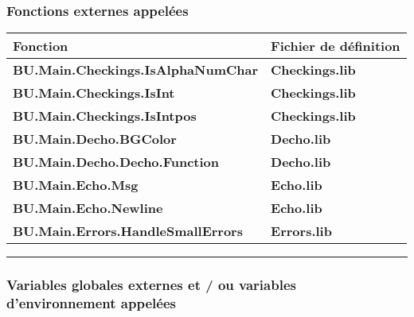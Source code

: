 \documentclass[a4paper,10pt]{article}
\begin{document}
    \subsubsection{Fonctions externes appelées}\color{text}

    \begin{justify}
        \begin{tabular}{|l|l|}
            \hline
            \textbf{Fonction} & \textbf{Fichier de définition}\\
            \hline
            \textbf{\color{func}BU.Main.Checkings.IsAlphaNumChar}    & \textbf{\color{path}Checkings.lib}\\
            \hline
            \textbf{\color{func}BU.Main.Checkings.IsInt}             & \textbf{\color{path}Checkings.lib}\\
            \hline
            \textbf{\color{func}BU.Main.Checkings.IsIntpos}          & \textbf{\color{path}Checkings.lib}\\
            \hline
            \textbf{\color{func}BU.Main.Decho.BGColor}              & \textbf{\color{path}Decho.lib}\\
            \hline
            \textbf{\color{func}BU.Main.Decho.Decho.Function}    & \textbf{\color{path}Decho.lib}\\
            \hline
            \textbf{\color{func}BU.Main.Echo.Msg}           & \textbf{\color{path}Echo.lib}\\
            \hline
            \textbf{\color{func}BU.Main.Echo.Newline}           & \textbf{\color{path}Echo.lib}\\
            \hline
            \textbf{\color{func}BU.Main.Errors.HandleSmallErrors}   & \textbf{\color{path}Errors.lib}\\
            \hline
        \end{tabular}
    \end{justify}

    \setlength{\parskip}{2em}



    \color{sec3}\par\noindent\rule{\textwidth}{0.4pt}\color{text}\setlength{\parskip}{1em}

    \color{sec3}
    \subsubsection{Variables globales externes et / ou variables d'environnement appelées}\color{text}
\end{document}

